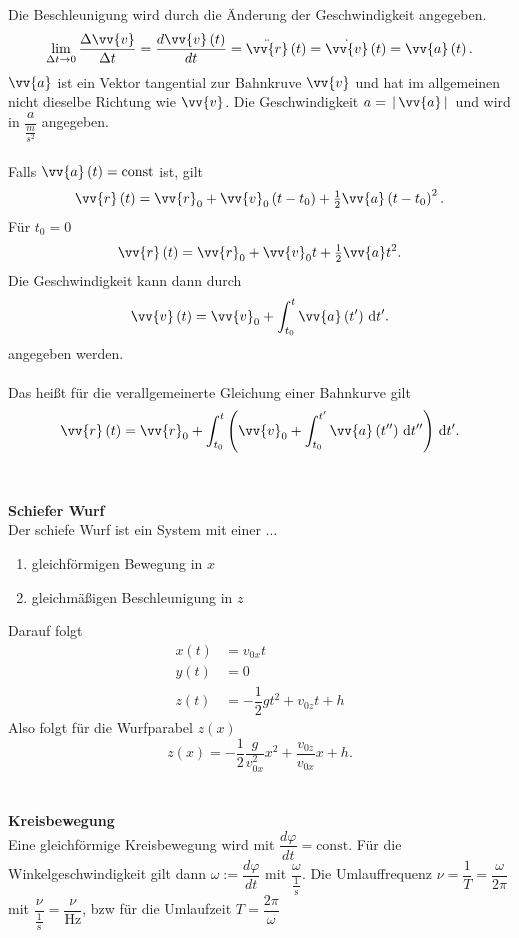 \documentclass[a4paper,12pt]{article}
\newcommand{\td}{\,\text{d}}
\begin{document}
Die Beschleunigung wird durch die Änderung der Geschwindigkeit angegeben.
\[ 
        \lim_{\Delta t\rightarrow 0}\dfrac{\Delta \vv{v}}{\Delta t}=\dfrac{d\vv{v}\left(t\right)}{dt}=\ddot{\vv{r}}\left(t\right)=\dot{\vv{v}}\left(t\right)=\vv{a}\left(t\right)
.\] 
$\vv{a}$ ist ein Vektor tangential zur Bahnkruve $\vv{v}$ und hat im allgemeinen nicht dieselbe Richtung wie $\vv{v}$. Die Geschwindigkeit $a=\,|\, \vv{a}\,|\, $ und wird in $\dfrac{a}{\tfrac{m}{s ^2}}$ angegeben.\\\\
Falls $\vv{a}\left(t\right)=\text{const}$ ist, gilt
\[ 
        \vv{r}\left(t\right)=\vv{r}_0+\vv{v}_0\left(t-t_0\right)+\tfrac{1}{2}\vv{a}\left(t-t_0\right)^2
.\] 
Für $t_0=0$ 
\[ 
\vv{r}\left(t\right)=\vv{r}_0+\vv{v}_0t+\tfrac{1}{2}\vv{a}t^2
.\] 
Die Geschwindigkeit kann dann durch
\[ 
\vv{v}\left(t\right)=\vv{v}_0+\int_{t_0}^{t}\vv{a}\left(t'\right)\td t'
.\] 
angegeben werden.\\\\
Das heißt für die verallgemeinerte Gleichung einer Bahnkurve gilt
\[ 
\vv{r}\left(t\right)=\vv{r}_0+\int_{t_0}^{t}\left(\vv{v}_0+\int_{t_0}^{t'}\vv{a}\left(t''\right)\td t''\right)\td t'
.\] 
\\\hfill\\\textbf{Schiefer Wurf}\\ 
Der schiefe Wurf ist ein System mit einer ...
\begin{enumerate}[label=...]
        \item gleichförmigen Bewegung in $x$ 
        \item gleichmäßigen Beschleunigung in $z$ 
\end{enumerate}
Darauf folgt
\begin{align*}
        x\left(t\right)&=v_{0x}t\\
        y\left(t\right)&=0\\
        z\left(t\right)&=-\dfrac{1}{2}gt^2+v_{0z}t+h
\end{align*}
Also folgt für die Wurfparabel $z\left(x\right)$ 
\[ 
        z\left(x\right)=-\dfrac{1}{2}\dfrac{g}{v_{0x}^2}x^2+\dfrac{v_{0z}}{v_{0x}}x+h
.\] 
\\\hfill\\\textbf{Kreisbewegung}\\ 
Eine gleichförmige Kreisbewegung wird mit $\dfrac{d\varphi }{dt}=\text{const}$. Für die Winkelgeschwindigkeit gilt dann $\omega :=\dfrac{d\varphi }{dt}$ mit $\dfrac{\omega }{\tfrac{1}{\,\text{s}\,}}$. Die Umlauffrequenz $\nu =\dfrac{1}{T}=\dfrac{\omega }{2\pi }$ mit $\dfrac{\nu }{\tfrac{1}{\,\text{s}\,}}=\dfrac{\nu }{\text{Hz}}$, bzw für die Umlaufzeit $T=\dfrac{2\pi }{\omega }$  
\end{document}
